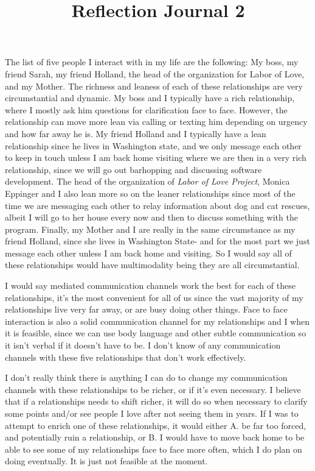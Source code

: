 \documentclass[12pt]{article}
\begin{document}
\title{Reflection Journal 2}
\par
The list of five people I interact with in my life are the following: My boss, my friend Sarah, my friend Holland, the head of the organization for Labor of Love, and my Mother. The richness and leaness of each of these relationships are very circumstantial and dynamic. My boss and I typically have a rich relationship, where I mostly ask him questions for clarification face to face. However, the relationship can move more lean via calling or texting him depending on urgency and how far away he is. My friend Holland and I typically have a lean relationship since he lives in Washington state, and we only message each other to keep in touch unless I am back home visiting where we are then in a very rich relationship, since we will go out barhopping and discussing software development. The head of the organization of \emph{Labor of Love Project}, Monica Eppinger and I also lean more so on the leaner relationships since most of the time we are messaging each other to relay information about dog and cat rescues, albeit I will go to her house every now and then to discuss something with the program. Finally, my Mother and I are really in the same circumstance as my friend Holland, since she lives in Washington State- and for the most part we just message each other unless I am back home and visiting. So I would say all of these relationships would have multimodality being they are all circumstantial.
\par
I would say mediated communication channels work the best for each of these relationships, it's the most convenient for all of us since the vast majority of my relationships live very far away, or are busy doing other things. Face to face interaction is also a solid communication channel for my relationships and I when it is feasible, since we can use body language and other subtle communication so it isn't verbal if it doesn't have to be. I don't know of any communication channels with these five relationships that don't work effectively.
\par
I don't really think there is anything I can do to change my communication channels with these relationships to be richer, or if it's even necessary. I believe that if a relationships needs to shift richer, it will do so when necessary to clarify some points and/or see people I love after not seeing them in years. If I was to attempt to enrich one of these relationships, it would either A. be far too forced, and potentially ruin a relationship, or B. I would have to move back home to be able to see some of my relationships face to face more often, which I do plan on doing eventually. It is just not feasible at the moment.
\end{document}
